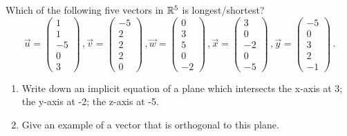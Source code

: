 \documentclass[12pt]{amsart}
\begin{document}
\begin{problem}
    Which of the following five vectors in $\mathbb{R}^5$ is longest/shortest?
    \begin{equation*}
        \vec{u} = \begin{pmatrix}
            1 \\ 1 \\ -5 \\ 0 \\3
        \end{pmatrix} \,,
        \vec{v} = \begin{pmatrix}
            -5 \\ 2 \\ 2 \\2  \\ 0
        \end{pmatrix} \,,
        \vec{w} = \begin{pmatrix}
            0 \\ 3 \\ 5 \\ 0 \\ -2 
        \end{pmatrix} \,,
        \vec{x} = \begin{pmatrix}
            3 \\ 0 \\ -2 \\ 0 \\ -5
        \end{pmatrix} \,,
        \vec{y} = \begin{pmatrix}
            -5 \\ 0 \\ 3 \\ 2 \\ -1
        \end{pmatrix} \,.
    \end{equation*}
\end{problem}


\begin{problem}
    \begin{enumerate}
        \item Write down an implicit equation of a plane which intersects
    the x-axis at 3; the y-axis at -2; the z-axis at -5.
        \item Give an example of a vector that is orthogonal to this plane.
    \end{enumerate}
\end{problem}
\end{document}
